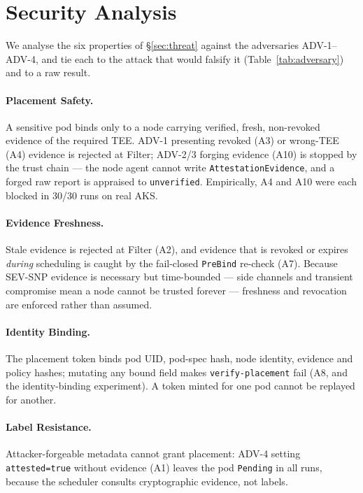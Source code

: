 \section{Security Analysis}
\label{sec:security-analysis}

We analyse the six properties of \S\ref{sec:threat} against the adversaries
ADV-1--ADV-4, and tie each to the attack that would falsify it
(Table~\ref{tab:adversary}) and to a raw result.

\paragraph{Placement Safety.}
A sensitive pod binds only to a node carrying verified, fresh, non-revoked
evidence of the required TEE. ADV-1 presenting revoked (A3) or wrong-TEE (A4)
evidence is rejected at Filter; ADV-2/3 forging evidence (A10) is stopped by the
trust chain --- the node agent cannot write \texttt{AttestationEvidence}, and a
forged raw report is appraised to \texttt{unverified}. Empirically, A4 and A10
were each blocked in 30/30 runs on real AKS.

\paragraph{Evidence Freshness.}
Stale evidence is rejected at Filter (A2), and evidence that is revoked or
expires \emph{during} scheduling is caught by the fail-closed \texttt{PreBind}
re-check (A7). Because SEV-SNP evidence is necessary but time-bounded --- side
channels and transient compromise mean a node cannot be trusted forever
\cite{li2021cipherleaks} --- freshness and revocation are enforced rather than
assumed.

\paragraph{Identity Binding.}
The placement token binds pod UID, pod-spec hash, node identity, evidence and
policy hashes; mutating any bound field makes \texttt{verify-placement} fail
(A8, and the identity-binding experiment). A token minted for one pod cannot be
replayed for another.

\paragraph{Label Resistance.}
Attacker-forgeable metadata cannot grant placement: ADV-4 setting
\texttt{attested=true} without evidence (A1) leaves the pod \texttt{Pending} in
all runs, because the scheduler consults cryptographic evidence, not labels.


